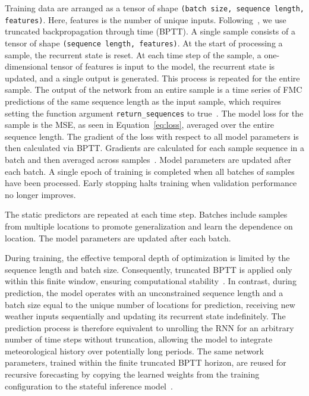 \documentclass[fire,article,submit,pdftex,moreauthors]{Definitions/mdpi}
\begin{document}
Training data are arranged as a tensor of shape \texttt{(batch size, sequence length, features)}. Here, features is the number of unique inputs. Following~\citet[Sect.~9.7]{Zhang-2023-DDL}, we use truncated backpropagation through time (BPTT). A single sample consists of a tensor of shape \texttt{(sequence length, features)}. At the start of processing a sample, the recurrent state is reset. At each time step of the sample, a one-dimensional tensor of features is input to the model, the recurrent state is updated, and a single output is generated. This process is repeated for the entire sample. The output of the network from an entire sample is a time series of FMC predictions of the same sequence length as the input sample, which requires setting the function argument \texttt{return\_sequences} to true~\citep{Keras-2025-LSTM}. The model loss for the sample is the MSE, as seen in Equation~\ref{eq:loss}, averaged over the entire sequence length. The gradient of the loss with respect to all model parameters is then calculated via BPTT. Gradients are calculated for each sample sequence in a batch and then averaged across samples~\citep{Keras-2025-Loss}. Model parameters are updated after each batch. A single epoch of training is completed when all batches of samples have been processed. Early stopping halts training when validation performance no longer improves. 

The static predictors are repeated at each time step. Batches include samples from multiple locations to promote generalization and learn the dependence on location. The model parameters are updated after each batch.

During training, the effective temporal depth of optimization is limited by the sequence length and batch size. Consequently, truncated BPTT is applied only within this finite window, ensuring computational stability~\citep[Sect. 9.7.1.2]{Zhang-2023-DDL}. In contrast, during prediction, the model operates with an unconstrained sequence length and a batch size equal to the unique number of locations for prediction, receiving new weather inputs sequentially and updating its recurrent state indefinitely. The prediction process is therefore equivalent to unrolling the RNN for an arbitrary number of time steps without truncation, allowing the model to integrate meteorological history over potentially long periods. The same network parameters, trained within the finite truncated BPTT horizon, are reused for recursive forecasting by copying the learned weights from the training configuration to the stateful inference model~\citep[p.~512]{Geron-2019-HOM}.
\end{document}
